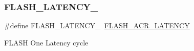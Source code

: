\subsubsection{\texorpdfstring{F\+L\+A\+S\+H\+\_\+\+L\+A\+T\+E\+N\+C\+Y\+\_}{FLASH\_LATENCY\_1}}
{\footnotesize\ttfamily \#define F\+L\+A\+S\+H\+\_\+\+L\+A\+T\+E\+N\+C\+Y\+\_~\hyperlink{group___peripheral___registers___bits___definition_gaef5e44cbb084160a6004ca9951ec7318}{F\+L\+A\+S\+H\+\_\+\+A\+C\+R\+\_\+\+L\+A\+T\+E\+N\+CY}}

F\+L\+A\+SH One Latency cycle 